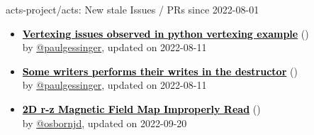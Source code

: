 \begin{frame}[allowframebreaks]{ acts-project/acts: New stale Issues / PRs since 2022-08-01 }
\begin{itemize}
    \item\iss\prstale\textbf{\href{https://github.com/acts-project/acts/issues/1091}{\textcolor{black}{Vertexing issues observed in python vertexing example}}}
    (\href{https://github.com/acts-project/acts/issues/1091}{}) \\
    by \href{https://github.com/paulgessinger}{@paulgessinger}, updated on 2022-08-11

    \item\iss\prstale\textbf{\href{https://github.com/acts-project/acts/issues/881}{\textcolor{black}{Some writers performs their writes in the destructor}}}
    (\href{https://github.com/acts-project/acts/issues/881}{}) \\
    by \href{https://github.com/paulgessinger}{@paulgessinger}, updated on 2022-08-11

    \item\iss\prstale\textbf{\href{https://github.com/acts-project/acts/issues/669}{\textcolor{black}{2D r-z Magnetic Field Map Improperly Read}}}
    (\href{https://github.com/acts-project/acts/issues/669}{}) \\
    by \href{https://github.com/osbornjd}{@osbornjd}, updated on 2022-09-20

  \end{itemize}
\end{frame}



